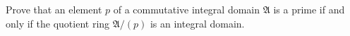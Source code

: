 Prove that an element $p$ of a commutative integral domain $\mathfrak{A}$ is a prime if and only if the quotient ring $\mathfrak{A}/(p)$ is an integral domain.